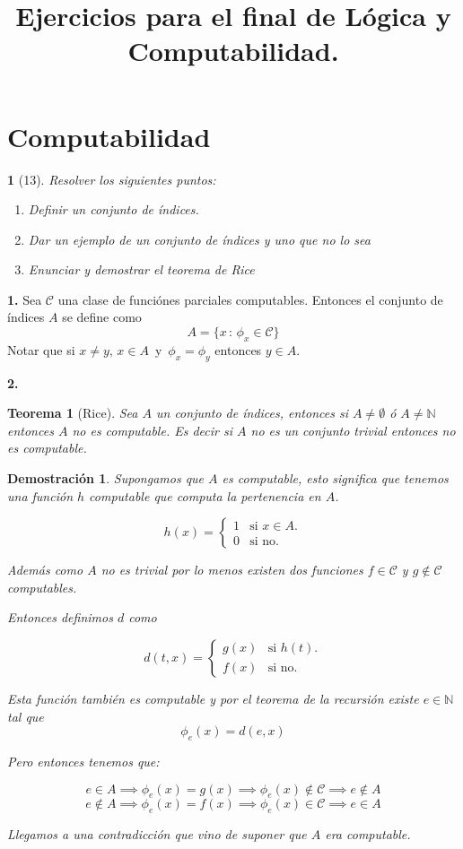 \documentclass[leqno, 12pt, twoside,letterpaper]{book}
\title{Ejercicios para el final de Lógica y Computabilidad.}
\theoremstyle{plain}
\newtheorem{thm}{Teorema}[chapter]
\newtheorem*{dem}{Demostración}
\newtheorem{ej}{}
\theoremstyle{definition}
\newcommand{\set}[2]{\{ #1 \, : \, #2 \}}
\newcommand{\naturals}[0]{\mathbb{N}}
\newcommand{\class}[1][\mathcal]{#1}
\newenvironment{solution}[0]{\begin{adjustwidth}{1.5em}{1.5em}}{\end{adjustwidth}}
\newcommand{\twopartdef}[4]
{
	\left\{
		\begin{array}{ll}
			#1 & \mbox{si } #2 \\
			#3 & \mbox{} #4
		\end{array}
	\right.
}
\begin{document}
\maketitle
\section*{Computabilidad}

\begin{ej}[13]
    Resolver los siguientes puntos:
    \begin{enumerate}
        \item Definir un conjunto de índices.
        \item Dar un ejemplo de un conjunto de índices y uno que no lo sea
        \item Enunciar y demostrar el teorema de Rice
    \end{enumerate}
\end{ej}

\begin{solution}
\textbf{1.} Sea $\class{C}$ una clase de funciónes parciales computables. Entonces el conjunto de índices $A$ se define como 
\[
	A = \set{x}{\phi_{x} \in \class{C}}
\]
Notar que si $x \neq y$, $x \in A\,$ y $\,\phi_{x} = \phi_{y}$ entonces $y \in A$.  

\noindent\textbf{2.} 

\begin{thm}[Rice]Sea $A$ un conjunto de índices, entonces si $A \neq \emptyset$ ó $A \neq \naturals$ entonces $A$ no es computable. Es decir si $A$ no es un conjunto trivial entonces no es computable.
\end{thm}

\begin{dem}
	Supongamos que $A$ es computable, esto significa que tenemos una función $h$ computable que computa la pertenencia en $A$.
	
	\[
	h(x) = \twopartdef{1}{x \in A.}
					  {0}{\mbox{si no.}}
	\]
	
	\noindent Además como $A$ no es trivial por lo menos existen dos funciones $f \in \class{C}$ y $g \not\in \class{C}$ computables.
	
	\noindent Entonces definimos $d$ como 
	
	\[
		d(t, x) = \twopartdef{g(x)}{h(t).}
							 {f(x)}{\mbox{si no.}}
	\]
	
	\noindent Esta función también es computable y por el teorema de la recursión existe $e \in \naturals$ tal que 
	\[ 
	\phi_{e}(x) = d(e, x)
	\]
	
	\noindent Pero entonces tenemos que:
	
	\[ e \in A \implies \phi_{e}(x) = g(x) \implies \phi_{e}(x) \not\in \class{C} \implies e \not\in A\]
	\[ e \not\in A \implies \phi_{e}(x) = f(x) \implies \phi_{e}(x) \in \class{C} \implies e \in A\]
	
	\noindent Llegamos a una contradicción que vino de suponer que $A$ era computable.

\end{dem}
\end{solution}
\end{document}
